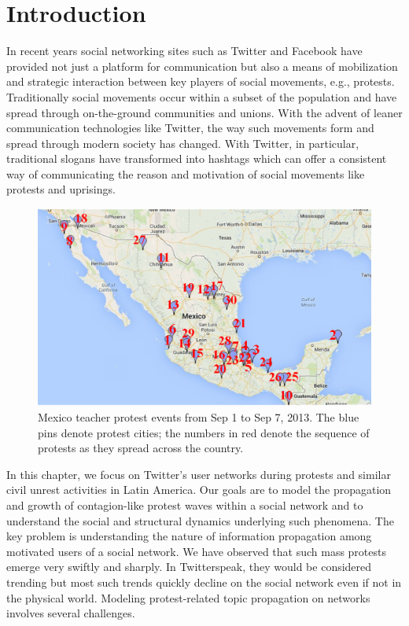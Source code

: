 \section{Introduction}
In recent years social networking sites such as Twitter and Facebook have
provided not just a platform for communication but also a means
of mobilization and strategic interaction between key players
of social movements, e.g., protests. Traditionally social movements occur
within a subset of the population and have spread through on-the-ground
communities and unions. With the advent of leaner communication
technologies like Twitter, the way such movements form and
spread through modern society has changed. With Twitter, in particular,
traditional slogans have transformed into hashtags which can
offer a consistent way of communicating the reason and
motivation of social movements like protests and uprisings.

\begin{figure}[h]
\centering
\includegraphics[scale=0.4]{figures/mexico_teacher_protest.png}
\caption{Mexico teacher protest events from Sep 1 to Sep 7, 2013. The blue pins denote protest cities; the numbers in red denote the sequence of
protests as they spread across the country.}
\label{fig:mexico_teacher}
\end{figure}


In this chapter, we focus on Twitter's
user networks during protests
and similar civil unrest activities in Latin America. Our goals
are to model the propagation and growth of contagion-like protest
waves within a social network and to understand the social and
structural dynamics underlying such phenomena. The key problem
is understanding the nature of information propagation among motivated
users of a social network. We have observed that such mass
protests emerge very swiftly and sharply. In Twitterspeak, they
would be considered trending but most such trends quickly decline
on the social network even if not in the physical world. Modeling
protest-related topic propagation on networks involves several challenges.

